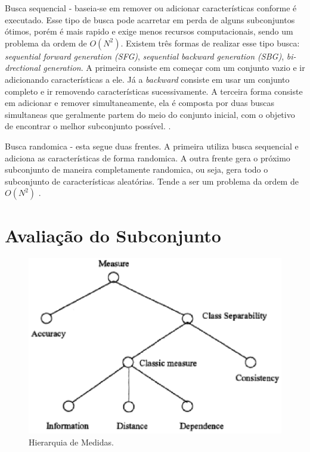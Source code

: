 Busca sequencial - baseia-se em remover ou adicionar características conforme é executado. Esse tipo de busca pode acarretar em perda de alguns subconjuntos ótimos, porém é mais rapido e exige menos recursos computacionais, sendo um problema da ordem de $O(N^2)$. \cite{dash_1997} Existem três formas de realizar esse tipo busca: \textit{sequential forward generation (SFG)}, \textit{ sequential backward generation (SBG)}, \textit{bi-drectional generation}. A primeira consiste em começar com um conjunto vazio e ir adicionando características a ele. Já a \textit{backward} consiste em usar um conjunto completo e ir removendo características sucessivamente. A terceira forma consiste em adicionar e remover simultaneamente, ela é composta por duas buscas simultaneas que geralmente partem do meio do conjunto inicial, com o objetivo de encontrar o melhor subconjunto possível. \cite{liu_2005}. 

Busca randomica - esta segue duas frentes. A primeira utiliza busca sequencial e adiciona as características de forma randomica. A outra frente gera o próximo subconjunto de maneira completamente randomica, ou seja, gera todo o subconjunto de características aleatórias. Tende a ser um problema da ordem de $O(N^2)$ \cite{liu_2005}.

\section{Avaliação do Subconjunto}

\begin{figure}[h]
	\centering
	\label{fig04}
		\includegraphics[keepaspectratio=true,scale=1]{figuras/fig04.eps}
	\caption{Hierarquia de Medidas. \cite{huan_1998}}
\end{figure}

